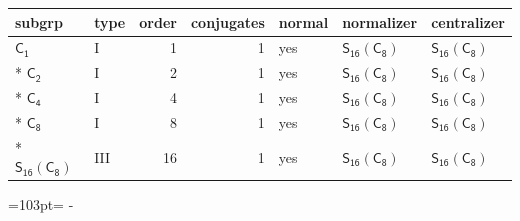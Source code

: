 \documentclass[10pt,a4paper]{article}
\newcommand{\needspace}[1]{\par\penalty-100\begingroup\dimen0=#1\relax\dimen2=\pagegoal
  \advance\dimen2-\pagetotal\ifdim\dimen0>\dimen2\relax\ifdim\dimen2>0pt\vfil\break\fi\fi
  \endgroup}
\numberwithin{equation}{section}
\newcommand{\grp}[1]{\mathsf{#1}}
\begin{document}
{\small\begin{longtable}{@{}llrrlll@{}}\toprule
subgrp & type & order & conjugates & normal & normalizer & centralizer\\\midrule\endhead
\bottomrule\endfoot\endlastfoot
\href{../../../rotation/data/pdf/C1.pdf}{$\grp{C_{1}}$} & I & 1 & 1 & yes & \href{S16-C8.pdf}{$\grp{S_{16}}(\grp{C_{8}})$} & \href{S16-C8.pdf}{$\grp{S_{16}}(\grp{C_{8}})$}\\*
\href{../../../rotation/data/pdf/C2.pdf}{$\grp{C_{2}}$} & I & 2 & 1 & yes & \href{S16-C8.pdf}{$\grp{S_{16}}(\grp{C_{8}})$} & \href{S16-C8.pdf}{$\grp{S_{16}}(\grp{C_{8}})$}\\*
\href{../../../rotation/data/pdf/C4.pdf}{$\grp{C_{4}}$} & I & 4 & 1 & yes & \href{S16-C8.pdf}{$\grp{S_{16}}(\grp{C_{8}})$} & \href{S16-C8.pdf}{$\grp{S_{16}}(\grp{C_{8}})$}\\*
\href{../../../rotation/data/pdf/C8.pdf}{$\grp{C_{8}}$} & I & 8 & 1 & yes & \href{S16-C8.pdf}{$\grp{S_{16}}(\grp{C_{8}})$} & \href{S16-C8.pdf}{$\grp{S_{16}}(\grp{C_{8}})$}\\*
\href{S16-C8.pdf}{$\grp{S_{16}}(\grp{C_{8}})$} & III & 16 & 1 & yes & \href{S16-C8.pdf}{$\grp{S_{16}}(\grp{C_{8}})$} & \href{S16-C8.pdf}{$\grp{S_{16}}(\grp{C_{8}})$}\\
\bottomrule\end{longtable}}
\needspace{103pt}
\end{document}
